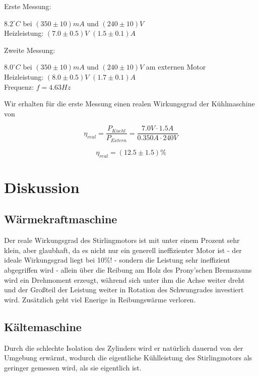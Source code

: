 \documentclass[12pt,a4paper,twopage]{article}
\begin{document}
Erste Messung:

$8.2^\circ C$ bei $(350 \pm 10)mA$ und $(240 \pm 10)V$\\
Heizleistung: $(7.0 \pm 0.5)V$ $(1.5 \pm 0.1)A$

Zweite Messung:

$8.0^\circ C$ bei $(350 \pm 10)mA$ und $(240 \pm 10)V$ am externen Motor\\
Heizleistung: $(8.0 \pm 0.5)V$ $(1.7 \pm 0.1)A$ \\
Frequenz: $f=4.63Hz$

Wir erhalten für die erste Messung einen realen Wirkungsgrad der Kühlmaschine von 

$$\eta_{real} = \frac{P_{Kuehl} }{P_{Extern} } = \frac{7.0 V \cdot 1.5 A}{0.350 A \cdot 240 V}$$

$$\boxed{ \eta_{real}=(12.5 \pm 1.5) \% }$$ 

\section{Diskussion}
\subsection{Wärmekraftmaschine}
Der reale Wirkungsgrad des Stirlingmotors ist mit unter einem Prozent sehr klein, aber glaubhaft, da es nicht nur ein generell ineffizienter Motor ist - der ideale Wirkungsgrad liegt bei 10\%! - sondern die Leistung sehr ineffizient abgegriffen wird - allein über die Reibung am Holz des Prony'schen Bremszauns wird ein Drehmoment erzeugt, während sich unter ihm die Achse weiter dreht und der Großteil der Leistung weiter in Rotation des Schwungrades investiert wird. Zusätzlich geht viel Enerige in Reibungswärme verloren. 
\subsection{Kältemaschine}
Durch die schlechte Isolation des Zylinders wird er natürlich dauernd von der Umgebung erwärmt, wodurch die eigentliche Kühlleistung des Stirlingmotors als geringer gemessen wird, als sie eigentlich ist. 																						
\end{document}
